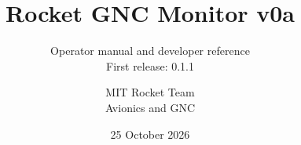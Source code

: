 \setcounter{secnumdepth}{3}
\setcounter{tocdepth}{2}
\title{Rocket GNC Monitor v0a}
\subtitle{Operator manual and developer reference\\First release: 0.1.1}
\author{MIT Rocket Team\\Avionics and GNC}
\date{25 October 2026}
